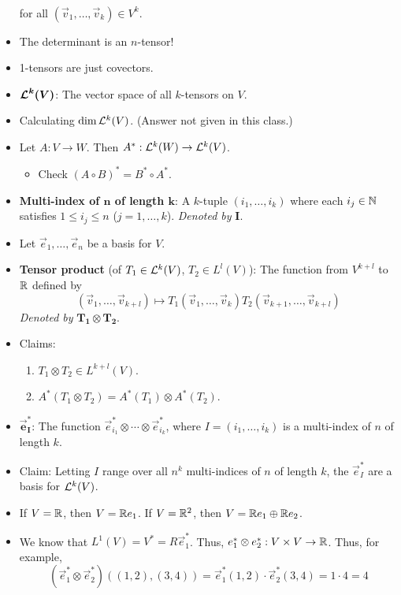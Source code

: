 \documentclass[../notes.tex]{subfiles}
\begin{document}
\begin{itemize}
\begin{align*}
    \end{align*}
    for all $(\vec{v}_1,\dots,\vec{v}_k)\in V^k$.
    \item The determinant is an $n$-tensor!
    \item 1-tensors are just covectors.
    \item $\bm{\lin[k]{V}}$: The vector space of all $k$-tensors on $V$.
    \item Calculating $\dim \lin[k]{V}$. (Answer not given in this class.)
    \item Let $A:V\to W$. Then $A^*:\lin[k]{W}\to\lin[k]{V}$.
    \begin{itemize}
        \item Check $(A\circ B)^*=B^*\circ A^*$.
    \end{itemize}
    \item \textbf{Multi-index of $\bm{n}$ of length $\bm{k}$}: A $k$-tuple $(i_1,\dots,i_k)$ where each $i_j\in\N$ satisfies $1\leq i_j\leq n$ ($j=1,\dots,k$). \emph{Denoted by} $\bm{I}$.
    \item Let $\vec{e}_1,\dots,\vec{e}_n$ be a basis for $V$.
    \item \textbf{Tensor product} (of $T_1\in \lin[k]{V}$, $T_2\in L^l(V)$): The function from $V^{k+l}$ to $\R$ defined by
    \begin{equation*}
        (\vec{v}_1,\dots,\vec{v}_{k+l}) \mapsto T_1(\vec{v}_1,\dots,\vec{v}_k)T_2(\vec{v}_{k+1},\dots,\vec{v}_{k+l})
    \end{equation*}
    \emph{Denoted by} $\bm{T_1\otimes T_2}$.
    \item Claims:
    \begin{enumerate}
        \item $T_1\otimes T_2\in L^{k+l}(V)$.
        \item $A^*(T_1\otimes T_2)=A^*(T_1)\otimes A^*(T_2)$.
    \end{enumerate}
    \item $\bm{\vec{e}_I^*}$: The function $\vec{e}_{i_1}^*\otimes\cdots\otimes\vec{e}_{i_k}^*$, where $I=(i_1,\dots,i_k)$ is a multi-index of $n$ of length $k$.
    \item Claim: Letting $I$ range over all $n^k$ multi-indices of $n$ of length $k$, the $\vec{e}_I^*$ are a basis for $\lin[k]{V}$.
    \item If $V=\R$, then $V=\R\vec{e}_1$. If $V=\R^2$, then $V=\R\vec{e}_1\oplus\R\vec{e}_2$.
    \item We know that $L^1(V)=V^*=R\vec{e}_1^*$. Thus, $\vec{e}_1^*\otimes\vec{e}_2^*:V\times V\to\R$. Thus, for example,
    \begin{equation*}
        (\vec{e}_1^*\otimes\vec{e}_2^*)((1,2),(3,4)) = \vec{e}_1^*(1,2)\cdot \vec{e}_2^*(3,4)
        = 1\cdot 4
        = 4
    \end{equation*}
\end{itemize}
\end{document}
